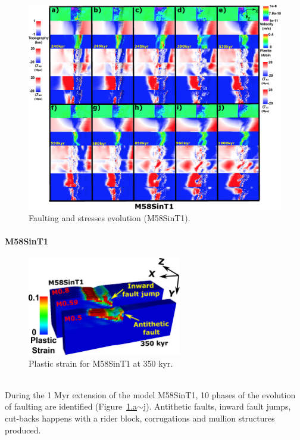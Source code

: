\begin{figure}[h]
 \centering
  \includegraphics[width=1.0\textwidth]{./Figures/fig_Results_Weakening_5_M58SinT1_time_evolution.eps}
 \caption{Faulting and stresses evolution (M58SinT1).}
\label{fig_Results_Weakenging_5}
\end{figure}

\paragraph{M58SinT1}\label{para_M58SinT1}

\begin{figure}[h]
 \centering
  \includegraphics[width=0.6\textwidth]{./Figures/fig_Results_3_4_2_3D_Antithetic_fault.eps}
 \caption{Plastic strain for M58SinT1 at 350 kyr.}
\label{fig_Results_3_4_2_3D_Antithetic_fault}
\end{figure}

~\\
During the 1 Myr extension of the model M58SinT1, 10 phases of the evolution of faulting are identified (Figure~\hyperref[fig_Results_Weakenging_5]{\ref{fig_Results_Weakenging_5}.a$\sim$j}). Antithetic faults, inward fault jumps, cut-backs happens with a rider block, corrugations and mullion structures produced.

